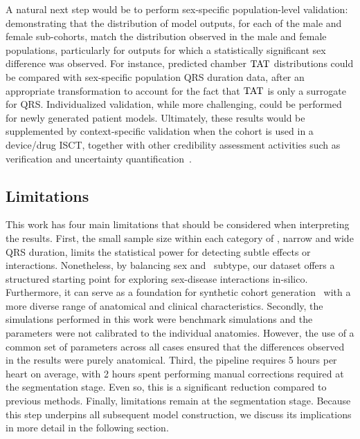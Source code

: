 A natural next step would be to perform sex-specific population-level validation: 
demonstrating that the distribution of model outputs, for each of the male and female sub-cohorts, 
match the distribution observed in the male and female populations, 
particularly for outputs for which a statistically significant sex difference was observed. 
For instance, predicted chamber $\mathrm{TAT}_{}$ distributions could be compared with sex-specific population 
QRS duration data, 
after an appropriate transformation to account for the fact that $\mathrm{TAT}_{}$ is only a surrogate for QRS.
Individualized validation, while more challenging, could be performed for newly generated patient models.
Ultimately, these results would be supplemented by context-specific validation when the cohort is used in a 
device/drug ISCT, together with other credibility assessment activities such as verification and 
uncertainty quantification~\cite{health_assessing_2023}.

\subsection{Limitations}
This work has four main limitations that should be considered when interpreting the results.
First, the small sample size within each category of \HF , narrow and wide QRS duration, 
limits the statistical power for detecting subtle effects or interactions. 
Nonetheless, by balancing sex and \HF\ subtype, our dataset offers a structured 
starting point for exploring sex-disease interactions in-silico.
Furthermore, it can serve as a foundation for synthetic cohort 
generation~\cite{rodero-2021-virtualcohort1000,rodero-2021-virtualcohortextreme}
with a more diverse range of anatomical and clinical characteristics. 
Secondly, the simulations performed in this work were benchmark simulations 
and the parameters were not calibrated to the individual anatomies.
However, the use of a common set of parameters across all cases
ensured that the differences observed in the results were purely anatomical.
Third, the pipeline requires 5 hours per heart on average, 
with 2 hours spent performing manual corrections required at the segmentation stage.
Even so, this is a significant reduction compared to previous methods.
Finally, limitations remain at the segmentation stage. 
Because this step underpins all subsequent model construction, 
we discuss its implications in more detail in the following section.

